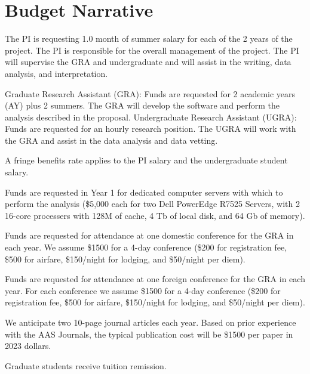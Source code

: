 \documentclass[12pt, preprint]{hacked-aastex}
\begin{document}
\printbibliography[title=~]

\clearpage
\section{Budget Narrative}\label{sec:budget}

 The PI is requesting 1.0 month of
summer salary for each of the 2 years of the project.  The PI is
responsible for the overall management of the project. The PI will
supervise the GRA and undergraduate and will assist in the writing,
data analysis, and interpretation.

 Graduate Research Assistant (GRA):
Funds are requested for 2 academic years (AY) plus 2 summers. The GRA
will develop the software and perform the analysis described in the
proposal. Undergraduate Research Assistant (UGRA): Funds are requested
for an hourly research position. The UGRA will work with the GRA and
assist in the data analysis and data vetting.

 A fringe benefits rate 
applies to the PI salary and the undergraduate student salary. %

 Funds are requested in Year 1 for 
dedicated computer  servers with which to perform the analysis (\$5,000 each
for two Dell PowerEdge R7525 Servers, with 2 16-core processers with 128M 
of cache, 4 Tb of local disk,  and 64 Gb of memory).

 Funds are requested for attendance at
one domestic conference for the GRA in each year. We assume \$1500 for
a 4-day conference (\$200 for registration fee, \$500 for airfare,
\$150/night for lodging, and \$50/night per diem).

 Funds are requested for attendance at
one foreign conference for the GRA in each year. For each conference
we assume \$1500 for a 4-day conference (\$200 for registration fee,
\$500 for airfare, \$150/night for lodging, and \$50/night per diem).

 We anticipate two 10-page journal
articles each year. Based on prior experience with the AAS Journals,
the typical publication cost will be \$1500 per paper in 2023 dollars.

Graduate students receive tuition remission. %
\end{document}
